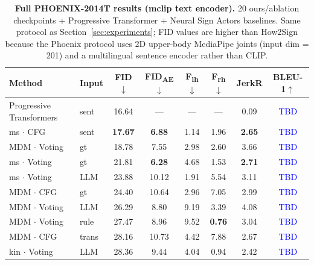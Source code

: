 \documentclass{article}
\newcommand{\placeholder}[1]{\textcolor{blue}{#1}}
\begin{document}
\begin{table}[h]
  \caption{\textbf{Full PHOENIX-2014T results (mclip text encoder).} 20 ours/ablation checkpoints + Progressive Transformer + Neural Sign Actors baselines. Same protocol as Section~\ref{sec:experiments}; FID values are higher than How2Sign because the Phoenix protocol uses 2D upper-body MediaPipe joints (input dim = 201) and a multilingual sentence encoder rather than CLIP.}
  \label{tab:phoenix_full}
  \centering
  \scriptsize
  \begin{tabular}{llcccccc}
    \toprule
    \textbf{Method} & \textbf{Input} & \textbf{FID}$\downarrow$ & \textbf{FID\textsubscript{AE}}$\downarrow$ & \textbf{F\textsubscript{lh}}$\downarrow$ & \textbf{F\textsubscript{rh}}$\downarrow$ & \textbf{JerkR} & \textbf{BLEU-1}$\uparrow$ \\
    \midrule
    Progressive Transformers & sent & 16.64 & ---           & ---  & ---           & 0.09 & \placeholder{TBD} \\
    ms $\cdot$ CFG          & sent       & \textbf{17.67} & \textbf{6.88} & 1.14          & 1.96          & \textbf{2.65} & \placeholder{TBD} \\
    MDM $\cdot$ Voting       & gt        & 18.78          & 7.55          & 2.98          & 2.60          & 3.66          & \placeholder{TBD} \\
    ms $\cdot$ Voting        & gt        & 21.81          & \textbf{6.28} & 4.68          & 1.53          & \textbf{2.71} & \placeholder{TBD} \\
    ms $\cdot$ Voting        & LLM       & 23.88          & 10.12         & 1.91          & 5.54          & 3.11          & \placeholder{TBD} \\
    MDM $\cdot$ CFG          & gt        & 24.40          & 10.64         & 2.96          & 7.05          & 2.99          & \placeholder{TBD} \\
    MDM $\cdot$ Voting       & LLM       & 26.29          & 8.80          & 9.19          & 3.39          & 4.08          & \placeholder{TBD} \\
    MDM $\cdot$ Voting       & rule      & 27.47          & 8.96          & 9.52          & \textbf{0.76} & 3.04          & \placeholder{TBD} \\
    MDM $\cdot$ CFG          & trans     & 28.16          & 10.73         & 4.42          & 7.88          & 2.67          & \placeholder{TBD} \\
    kin $\cdot$ Voting       & LLM       & 28.36          & 9.44          & 4.04          & 0.94          & 2.42          & \placeholder{TBD} \\

\end{tabular}
\end{table}
\end{document}
